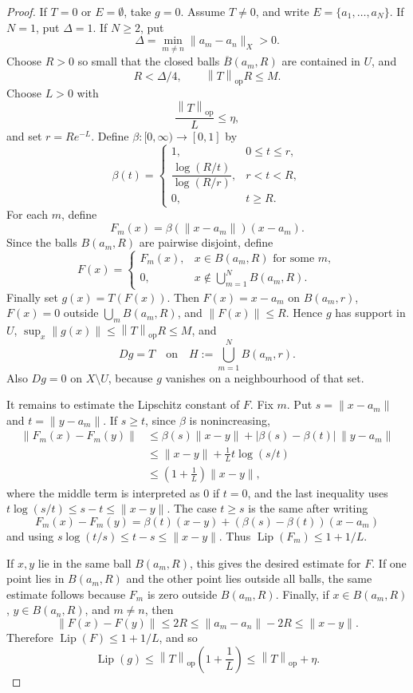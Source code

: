\documentclass[11pt]{article}
\DeclareMathOperator{\Lip}{Lip}
\newcommand{\opnorm}[1]{\left\|#1\right\|_{\mathrm{op}}}
\begin{document}
\begin{proof}
If \(T=0\) or \(E=\emptyset\), take \(g=0\).  Assume \(T\neq 0\), and write
\(E=\{a_1,\ldots,a_N\}\).  If \(N=1\), put \(\Delta=1\).  If \(N\geq2\), put
\[
  \Delta=\min_{m\neq n}\|a_m-a_n\|_X>0.
\]
Choose \(R>0\) so small that the closed balls \(\overline B(a_m,R)\) are
contained in \(U\), and
\[
  R<\Delta/4,\qquad \opnorm{T}R\leq M.
\]
Choose \(L>0\) with
\[
  \frac{\opnorm{T}}{L}\leq \eta,
\]
and set \(r=Re^{-L}\).  Define \(\beta:[0,\infty)\to[0,1]\) by
\[
\beta(t)=
\begin{cases}
1, & 0\leq t\leq r,\\
\dfrac{\log(R/t)}{\log(R/r)}, & r<t<R,\\
0, & t\geq R.
\end{cases}
\]
For each \(m\), define
\[
  F_m(x)=\beta(\|x-a_m\|)(x-a_m).
\]
Since the balls \(B(a_m,R)\) are pairwise disjoint, define
\[
  F(x)=
  \begin{cases}
  F_m(x), & x\in B(a_m,R)\text{ for some }m,\\
  0, & x\notin \bigcup_{m=1}^N B(a_m,R).
  \end{cases}
\]
Finally set \(g(x)=T(F(x))\).  Then \(F(x)=x-a_m\) on \(B(a_m,r)\),
\(F(x)=0\) outside \(\bigcup_m B(a_m,R)\), and \(\|F(x)\|\leq R\).  Hence
\(g\) has support in \(U\), \(\sup_x\|g(x)\|\leq\opnorm{T}R\leq M\), and
\[
  Dg=T\quad\text{on}\quad H:=\bigcup_{m=1}^N B(a_m,r).
\]
Also \(Dg=0\) on \(X\setminus U\), because \(g\) vanishes on a neighbourhood of
that set.

It remains to estimate the Lipschitz constant of \(F\).  Fix \(m\).  Put
\(s=\|x-a_m\|\) and \(t=\|y-a_m\|\).  If \(s\geq t\), since \(\beta\) is
nonincreasing,
\[
\begin{aligned}
\|F_m(x)-F_m(y)\|
&\leq \beta(s)\|x-y\|+|\beta(s)-\beta(t)|\,\|y-a_m\|\\
&\leq \|x-y\|+\frac{1}{L}t\log(s/t)\\
&\leq \left(1+\frac1L\right)\|x-y\|,
\end{aligned}
\]
where the middle term is interpreted as \(0\) if \(t=0\), and the last
inequality uses \(t\log(s/t)\leq s-t\leq\|x-y\|\).  The case \(t\geq s\) is
the same after writing
\[
F_m(x)-F_m(y)=\beta(t)(x-y)+(\beta(s)-\beta(t))(x-a_m)
\]
and using \(s\log(t/s)\leq t-s\leq\|x-y\|\).  Thus
\(\Lip(F_m)\leq 1+1/L\).

If \(x,y\) lie in the same ball \(B(a_m,R)\), this gives the desired estimate
for \(F\).  If one point lies in \(B(a_m,R)\) and the other point lies outside
all balls, the same estimate follows because \(F_m\) is zero outside
\(B(a_m,R)\).  Finally, if \(x\in B(a_m,R)\), \(y\in B(a_n,R)\), and
\(m\neq n\), then
\[
  \|F(x)-F(y)\|\leq 2R
  \leq \|a_m-a_n\|-2R
  \leq \|x-y\|.
\]
Therefore \(\Lip(F)\leq 1+1/L\), and so
\[
  \Lip(g)\leq \opnorm{T}\left(1+\frac1L\right)\leq \opnorm{T}+\eta.
\]
\end{proof}
\end{document}
